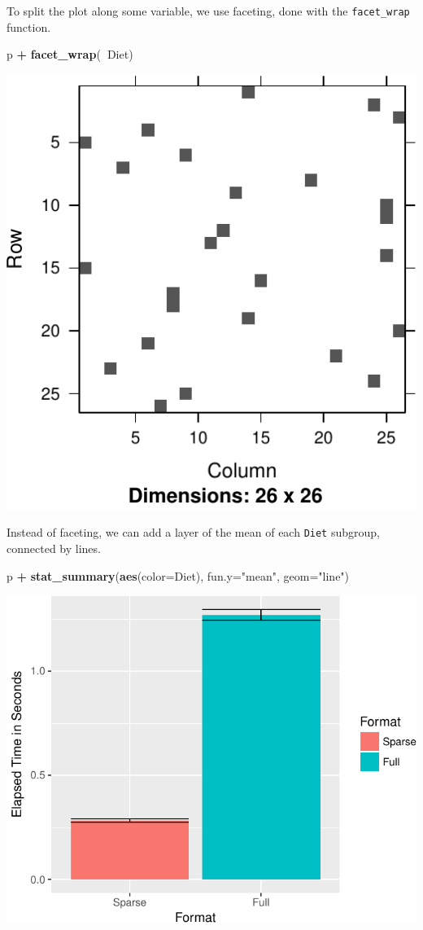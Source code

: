 \documentclass[]{book}
\newenvironment{Shaded}{\begin{snugshade}}{\end{snugshade}}
\newcommand{\DataTypeTok}[1]{\textcolor[rgb]{0.13,0.29,0.53}{#1}}
\newcommand{\KeywordTok}[1]{\textcolor[rgb]{0.13,0.29,0.53}{\textbf{#1}}}
\newcommand{\NormalTok}[1]{#1}
\newcommand{\OperatorTok}[1]{\textcolor[rgb]{0.81,0.36,0.00}{\textbf{#1}}}
\newcommand{\StringTok}[1]{\textcolor[rgb]{0.31,0.60,0.02}{#1}}
\theoremstyle{definition}
\theoremstyle{definition}
\theoremstyle{definition}
\theoremstyle{remark}
\begin{document}
To split the plot along some variable, we use faceting, done with the \texttt{facet\_wrap} function.

\begin{Shaded}
\begin{Highlighting}[]
\NormalTok{p }\OperatorTok{+}\StringTok{ }\KeywordTok{facet_wrap}\NormalTok{(}\OperatorTok{~}\NormalTok{Diet)}
\end{Highlighting}
\end{Shaded}

\includegraphics[width=0.5\linewidth]{Rcourse_files/figure-latex/unnamed-chunk-274-1}

Instead of faceting, we can add a layer of the mean of each \texttt{Diet} subgroup, connected by lines.

\begin{Shaded}
\begin{Highlighting}[]
\NormalTok{p }\OperatorTok{+}\StringTok{ }\KeywordTok{stat_summary}\NormalTok{(}\KeywordTok{aes}\NormalTok{(}\DataTypeTok{color=}\NormalTok{Diet), }\DataTypeTok{fun.y=}\StringTok{"mean"}\NormalTok{, }\DataTypeTok{geom=}\StringTok{"line"}\NormalTok{)}
\end{Highlighting}
\end{Shaded}

\includegraphics[width=0.5\linewidth]{Rcourse_files/figure-latex/unnamed-chunk-275-1}
\end{document}
